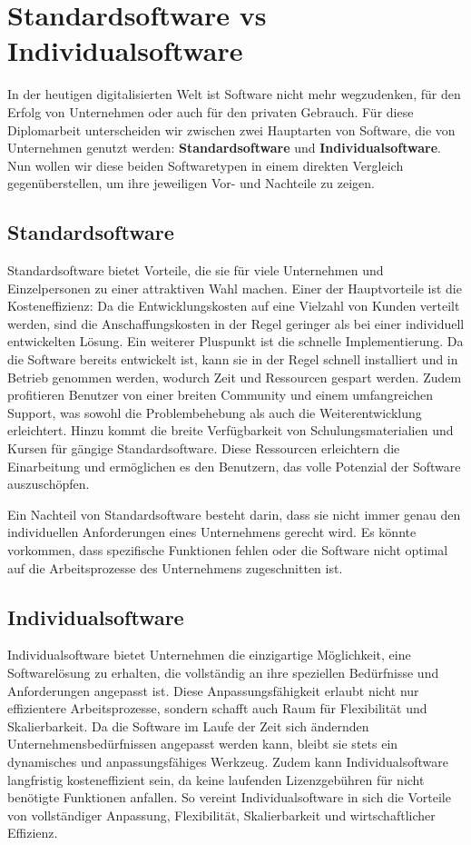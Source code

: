 \section {Standardsoftware vs Individualsoftware}

In der heutigen digitalisierten Welt ist Software nicht mehr wegzudenken,
für den Erfolg von Unternehmen oder auch für den privaten Gebrauch.
Für diese Diplomarbeit unterscheiden wir zwischen zwei Hauptarten von Software, 
die von Unternehmen genutzt werden: 
\textbf{Standardsoftware} und 
\textbf{Individualsoftware}.
Nun wollen wir diese beiden Softwaretypen in einem direkten 
Vergleich gegenüberstellen, um ihre jeweiligen Vor- und Nachteile zu zeigen.

\subsection*{Standardsoftware}

Standardsoftware bietet Vorteile, die sie für viele Unternehmen und Einzelpersonen 
zu einer attraktiven Wahl machen. Einer der Hauptvorteile ist die Kosteneffizienz: 
Da die Entwicklungskosten auf eine Vielzahl von Kunden verteilt werden, sind die 
Anschaffungskosten in der Regel geringer als bei einer individuell entwickelten Lösung. 
Ein weiterer Pluspunkt ist die schnelle Implementierung. Da die Software bereits entwickelt ist, 
kann sie in der Regel schnell installiert und in Betrieb genommen werden, 
wodurch Zeit und Ressourcen gespart werden. Zudem profitieren Benutzer von einer 
breiten Community und einem umfangreichen Support, was sowohl die Problembehebung 
als auch die Weiterentwicklung erleichtert. Hinzu kommt die breite Verfügbarkeit von 
Schulungsmaterialien und Kursen für gängige Standardsoftware. 
Diese Ressourcen erleichtern die Einarbeitung und ermöglichen es den Benutzern, 
das volle Potenzial der Software auszuschöpfen.

Ein Nachteil von Standardsoftware besteht darin, dass sie nicht immer genau 
den individuellen Anforderungen eines Unternehmens gerecht wird. 
Es könnte vorkommen, dass spezifische Funktionen fehlen oder die Software 
nicht optimal auf die Arbeitsprozesse des Unternehmens zugeschnitten ist.

\newpage
\subsection*{Individualsoftware}

Individualsoftware bietet Unternehmen die einzigartige Möglichkeit, eine Softwarelösung 
zu erhalten, die vollständig an ihre speziellen Bedürfnisse und Anforderungen angepasst ist. 
Diese Anpassungsfähigkeit erlaubt nicht nur effizientere Arbeitsprozesse, 
sondern schafft auch Raum für Flexibilität und Skalierbarkeit. 
Da die Software im Laufe der Zeit sich ändernden Unternehmensbedürfnissen angepasst werden kann, 
bleibt sie stets ein dynamisches und anpassungsfähiges Werkzeug. 
Zudem kann Individualsoftware langfristig kosteneffizient sein, da keine laufenden 
Lizenzgebühren für nicht benötigte Funktionen anfallen. 
So vereint Individualsoftware in sich die Vorteile von vollständiger Anpassung, 
Flexibilität, Skalierbarkeit und wirtschaftlicher Effizienz.

